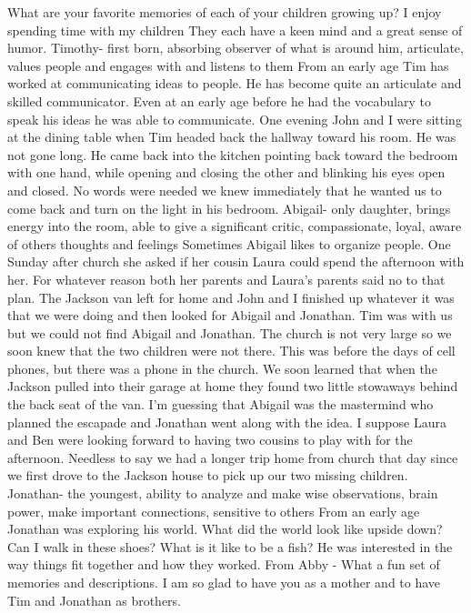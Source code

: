 What are your favorite memories of each of your children growing up?
I enjoy spending time with my children They each have a keen mind and a great sense of humor.
Timothy- first born, absorbing observer of what is around him, articulate, values people and engages with and listens to them
From an early age Tim has worked at communicating ideas to people. He has become quite an articulate and skilled communicator. Even at an early age before he had the vocabulary to speak his ideas he was able to communicate. One evening John and I were sitting at the dining table when Tim headed back the hallway toward his room. He was not gone long. He came back into the kitchen pointing back toward the bedroom with one hand, while opening and closing the other and blinking his eyes open and closed.  No words were needed we knew immediately that he wanted us to come back and turn on the light in his bedroom.
Abigail- only daughter, brings energy into the room, able to give a significant critic, compassionate, loyal, aware of others thoughts and feelings
Sometimes Abigail likes to organize people. One Sunday after church she asked if her cousin Laura could spend the afternoon with her. For whatever reason both her parents and Laura's parents said no to that plan. The Jackson van left for home and John and I finished up whatever it was that we were doing and then looked for Abigail and Jonathan. Tim was with us but we could not find Abigail and Jonathan. The church is not very large so we soon knew that the two children were not there. This was before the days of cell phones, but there was a phone in the church. We soon learned that when the Jackson pulled into their garage at home they found two little stowaways behind the back seat of the van. I'm guessing that Abigail was the mastermind who planned the escapade and Jonathan went along with the idea. I suppose Laura and Ben were looking forward to having two cousins to play with for the afternoon. Needless to say we had a longer trip home from church that day since we first drove to the Jackson house to pick up our two missing children.
Jonathan- the youngest, ability to analyze and make wise observations, brain power, make important connections, sensitive to others
From an early age Jonathan was exploring his world. What did the world look like upside down? Can I walk in these shoes? What is it like to be a fish? He was interested in the way things fit together and how they worked.
From Abby - What a fun set of memories and descriptions. I am so glad to have you as a mother and to have Tim and Jonathan as brothers.




